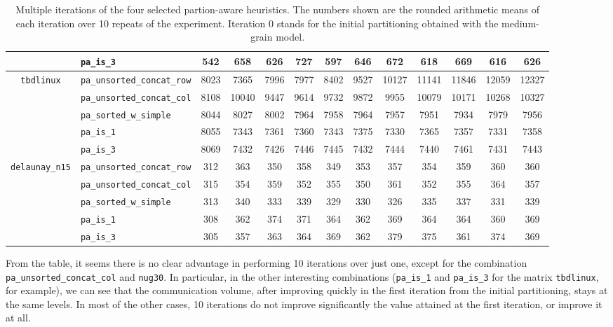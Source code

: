 \begin{table}
\begin{tabular}{|c|l|c||c|c|c|c|c|c|c|c|c|c|}
		&\verb|pa_is_3| &542 & 658 & 626 & 727 & 597 & 646 & 672 & 618 & 669 & 616 & 626 \\ \hline
		\multirow{5}{*}{\texttt{tbdlinux}}		&\verb|pa_unsorted_concat_row| & 8023 & 7365  & 7996  & 7977  & 8402  & 9527 & 10127 & 11141 & 11846 & 12059 & 12327 \\ 
		&\verb|pa_unsorted_concat_col| & 8108 & 10040  & 9447  & 9614  & 9732  & 9872  & 9955 & 10079 & 10171 & 10268 & 10327 \\ 
		&\verb|pa_sorted_w_simple| & 8044 & 8027 & 8002 & 7964 & 7958 & 7964 & 7957 & 7951 & 7934 & 7979 & 7956 \\
		&\verb|pa_is_1| & 8055 & 7343 & 7361 & 7360 & 7343 & 7375 & 7330 & 7365 & 7357 & 7331 & 7358 \\
		&\verb|pa_is_3| & 8069 & 7432 & 7426 & 7446 & 7445 & 7432 & 7444 & 7440 & 7461 & 7431 & 7443 \\ \hline
		\multirow{5}{*}{\texttt{delaunay\_n15}}		&\verb|pa_unsorted_concat_row| & 312 & 363 &  350 &  358 &  349 &  353 &  357 &  354  & 359 &  360 &  360 \\ 
		&\verb|pa_unsorted_concat_col| & 315 & 354 & 359 & 352 & 355 & 350 & 361 & 352 & 355 & 364 & 357 \\ 
		&\verb|pa_sorted_w_simple| & 313 & 340 & 333 & 339 & 329 & 330 & 326 & 335 & 337 & 331 & 339 \\
		&\verb|pa_is_1| & 308 & 362 & 374 & 371 & 364 & 362 & 369 & 364 & 364 & 360 & 369 \\
		&\verb|pa_is_3| & 305 & 357 & 363 & 364 & 369 & 362 & 379 & 375 & 361 & 374 & 369 \\\hline
		\end{tabular}
	\caption{Multiple iterations of the four selected partion-aware heuristics. The numbers shown are the rounded arithmetic means of each iteration over 10 repeats of the experiment. Iteration 0 stands for the initial partitioning obtained with the medium-grain model.} \label{tab:iterations}
\end{table}

From the table, it seems there is no clear advantage in performing 10 iterations over just one, except for the combination \verb|pa_unsorted_concat_col| and \verb|nug30|. In particular, in the other interesting combinations (\verb|pa_is_1| and \verb|pa_is_3| for the matrix \verb|tbdlinux|, for example), we can see that the communication volume, after improving quickly in the first iteration from the initial partitioning, stays at the same levels. In most of the other cases, 10 iterations do not improve significantly the value attained at the first iteration, or improve it at all.

